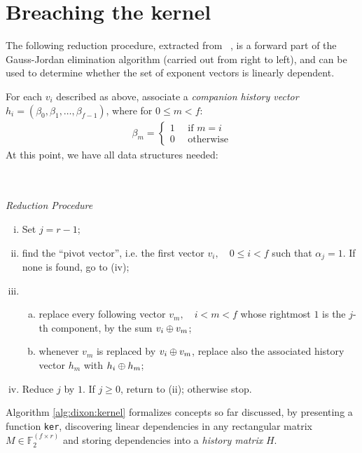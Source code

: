\section{Breaching the kernel}

The following reduction procedure, extracted from ~\cite{morrison-brillhart}, is
a forward part of the Gauss-Jordan elimination algorithm (carried out from right
to left), and can be used to determine whether the set of exponent vectors is
linearly dependent.

For each $v_i$ described as above, associate a \emph{companion history vector}
$h_i = (\beta_0, \beta_1, \ldots, \beta_{f-1})$, where for $0 \leq m < f$:
\begin{align*}
  \beta_m = \begin{cases}
    1 \quad \text{ if $m = i$} \\
    0 \quad \text{ otherwise}
    \end{cases}
\end{align*}
At this point, we have all data structures needed:
\\
\\
\\

\begin{center}
  \emph{Reduction Procedure}
\end{center}
\begin{enumerate}[(i)]
  \item Set $j=r-1$;
  \item find the ``pivot vector'', i.e. the first vector
    $v_i, \quad 0 \leq i < f$ such that $\alpha_j = 1$. If none is found, go
    to (iv);
  \item
    \begin{enumerate}[(a)]
      \item replace every following vector $v_m, \quad i < m < f$
        whose rightmost $1$ is the $j$-th component, by the sum $v_i \oplus v_m$;
      \item whenever $v_m$ is replaced by $v_i \oplus v_m$, replace also the
        associated history vector $h_m$ with $h_i \oplus h_m$;
    \end{enumerate}
  \item Reduce $j$ by $1$. If $j \geq 0$, return to (ii); otherwise stop.
\end{enumerate}

Algorithm \ref{alg:dixon:kernel} formalizes concepts so far discussed, by
presenting a function \texttt{ker}, discovering linear dependencies in any
rectangular matrix $M \in \mathbb{F}_2^{(f \times r)}$
and storing dependencies into a \emph{history matrix} $H$.

